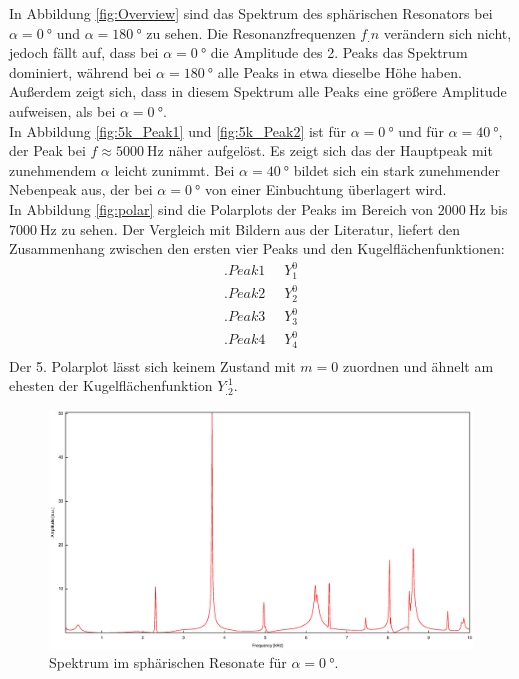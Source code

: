 In Abbildung \ref{fig:Overview} sind das Spektrum des sphärischen Resonators bei $\alpha=\SI{0}{\degree}$ und $\alpha=\SI{180}{\degree}$
zu sehen.
Die Resonanzfrequenzen $f_.n$ verändern sich nicht, jedoch fällt auf, dass bei $\alpha=\SI{0}{\degree}$ die Amplitude des 2. Peaks das Spektrum dominiert, während bei $\alpha=\SI{180}{\degree}$ alle Peaks in etwa dieselbe Höhe haben. Außerdem zeigt sich, dass in diesem Spektrum alle Peaks eine größere Amplitude aufweisen, als bei $\alpha=\SI{0}{\degree}$.\\
In Abbildung \ref{fig:5k_Peak1} und \ref{fig:5k_Peak2} ist für $\alpha=\SI{0}{\degree}$ und für $\alpha=\SI{40}{\degree}$, der Peak bei $f\approx\SI{5000}{\hertz}$ näher aufgelöst.
Es zeigt sich das der Hauptpeak mit zunehmendem $\alpha$ leicht zunimmt. Bei $\alpha=\SI{40}{\degree}$ bildet sich ein stark zunehmender Nebenpeak aus, der bei $\alpha=\SI{0}{\degree}$ von einer Einbuchtung überlagert wird.\\
In Abbildung \ref{fig:polar} sind die Polarplots der Peaks im Bereich von $\SI{2000}{\hertz}$ bis $\SI{7000}{\hertz}$ zu sehen.
Der Vergleich mit Bildern aus der Literatur\cite{V23}, liefert den Zusammenhang zwischen den ersten vier Peaks und den Kugelflächenfunktionen:
\begin{align*}
.{Peak 1}&\mathop{\widehat{=}} Y^0_1\\
.{Peak 2}&\mathop{\widehat{=}} Y^0_2\\
.{Peak 3}&\mathop{\widehat{=}} Y^0_3\\
.{Peak 4}&\mathop{\widehat{=}} Y^0_4\\
\end{align*}
Der 5. Polarplot lässt sich keinem Zustand mit $m=0$ zuordnen und ähnelt am ehesten der Kugelflächenfunktion $Y^.1_.2$.
\begin{figure}
\centering
\includegraphics[scale=0.35]{FP-V23data/2.1_0degree.eps}
\caption{Spektrum im sphärischen Resonate für $\alpha=\SI{0}{\degree}$.}
\label{fig:Overview1}
\end{figure}
